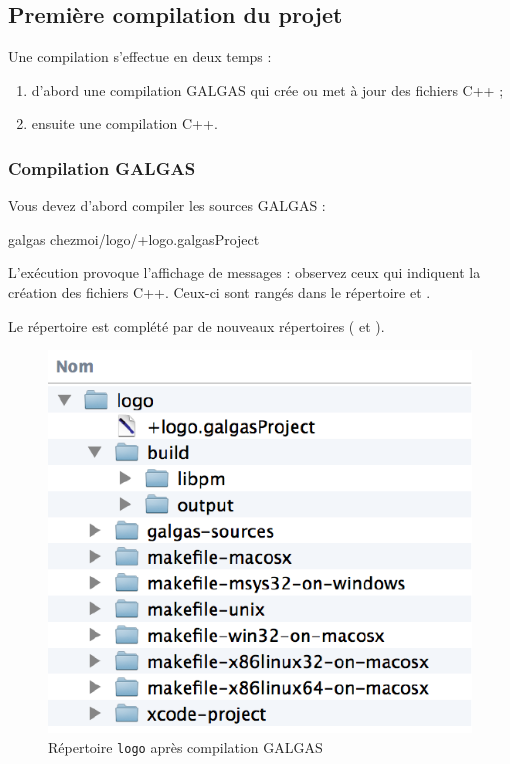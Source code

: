 \subsection{Première compilation du projet}

Une compilation s'effectue en deux temps :
\begin{enumerate}
  \item d'abord une compilation GALGAS qui crée ou met à jour des fichiers C++ ;
  \item ensuite une compilation C++.
\end{enumerate}


\subsubsection{Compilation GALGAS}

Vous devez d'abord compiler les sources GALGAS :
\begin{SHELL}
galgas chezmoi/logo/+logo.galgasProject
\end{SHELL}

L'exécution provoque l'affichage de messages : observez ceux qui indiquent la création des fichiers C++. Ceux-ci sont rangés dans le répertoire  et .

Le répertoire  est complété par de nouveaux répertoires ( et ).
\begin{figure}[t]
  \centering
  \includegraphics{partie-utilisation/repertoire-logo.pdf}
  \caption{Répertoire \texttt{logo} après compilation GALGAS}
  \ligne
\end{figure}


